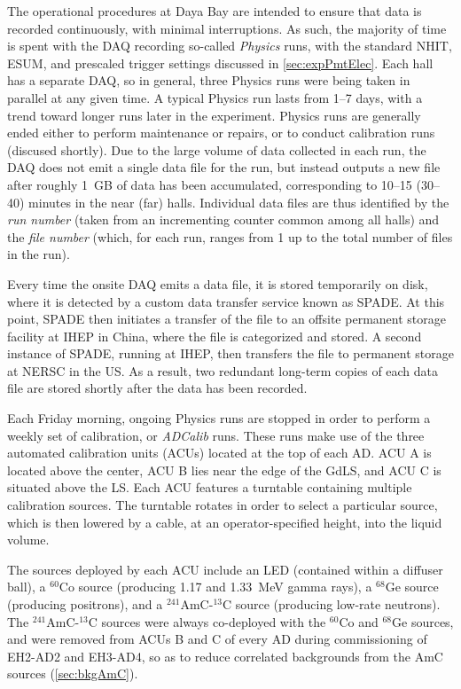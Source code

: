 \documentclass[../thesis.tex]{subfiles}
\begin{document}
The operational procedures at Daya Bay are intended to ensure that data is recorded continuously, with minimal interruptions. As such, the majority of time is spent with the DAQ recording so-called \emph{Physics} runs, with the standard NHIT, ESUM, and prescaled trigger settings discussed in \autoref{sec:expPmtElec}. Each hall has a separate DAQ, so in general, three Physics runs were being taken in parallel at any given time. A typical Physics run lasts from 1--7 days, with a trend toward longer runs later in the experiment. Physics runs are generally ended either to perform maintenance or repairs, or to conduct calibration runs (discused shortly). Due to the large volume of data collected in each run, the DAQ does not emit a single data file for the run, but instead outputs a new file after roughly 1~GB of data has been accumulated, corresponding to 10--15 (30--40) minutes in the near (far) halls. Individual data files are thus identified by the \emph{run number} (taken from an incrementing counter common among all halls) and the \emph{file number} (which, for each run, ranges from 1 up to the total number of files in the run).

Every time the onsite DAQ emits a data file, it is stored temporarily on disk, where it is detected by a custom data transfer service known as SPADE. At this point, SPADE then initiates a transfer of the file to an offsite permanent storage facility at IHEP in China, where the file is categorized and stored. A second instance of SPADE, running at IHEP, then transfers the file to permanent storage at NERSC in the US. As a result, two redundant long-term copies of each data file are stored shortly after the data has been recorded.

Each Friday morning, ongoing Physics runs are stopped in order to perform a weekly set of calibration, or \emph{ADCalib} runs. These runs make use of the three automated calibration units (ACUs) located at the top of each AD. ACU A is located above the center, ACU B lies near the edge of the GdLS, and ACU C is situated above the LS. Each ACU features a turntable containing multiple calibration sources. The turntable rotates in order to select a particular source, which is then lowered by a cable, at an operator-specified height, into the liquid volume.

The sources deployed by each ACU include an LED (contained within a diffuser ball), a $^{60}$Co source (producing 1.17 and 1.33~MeV gamma rays), a $^{68}$Ge source (producing positrons), and a $^{241}$AmC-$^{13}$C source (producing low-rate neutrons). The $^{241}$AmC-$^{13}$C sources were always co-deployed with the $^{60}$Co and $^{68}$Ge sources, and were removed from ACUs B and C of every AD during commissioning of EH2-AD2 and EH3-AD4, so as to reduce correlated backgrounds from the AmC sources (\autoref{sec:bkgAmC}).
\end{document}
